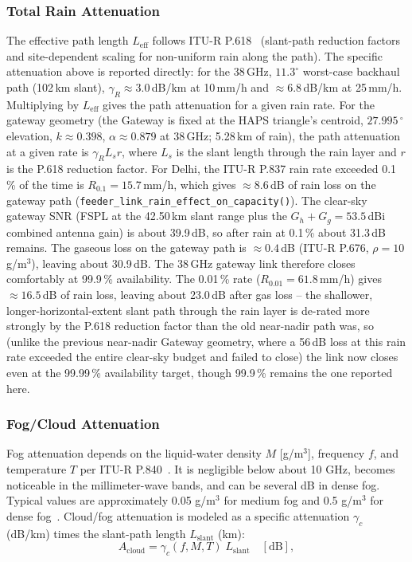 \documentclass[conference]{IEEEtran}
\begin{document}
\subsubsection{Total Rain Attenuation~\cite{itu_p618}}
The effective path length $L_\mathrm{eff}$ follows ITU-R P.618~\cite{itu_p618} (slant-path reduction factors and
site-dependent scaling for non-uniform rain along the path). The specific attenuation above is reported directly: for the 38\,GHz, $11.3^\circ$ worst-case backhaul path (102\,km slant), $\gamma_R\approx3.0$\,dB/km at 10\,mm/h and $\approx6.8$\,dB/km at 25\,mm/h. Multiplying by $L_\mathrm{eff}$ gives the path attenuation for a given rain rate. For the gateway geometry (the Gateway is fixed at the HAPS triangle's centroid, $27.995\,^\circ$ elevation, $k\approx0.398$, $\alpha\approx0.879$ at 38\,GHz; 5.28\,km of rain), the path attenuation at a given rate is $\gamma_R L_s r$, where $L_s$ is the slant length through the rain layer and $r$ is the P.618 reduction factor. For Delhi, the ITU-R P.837 rain rate exceeded 0.1\,\% of the time is $R_{0.1}=15.7$\,mm/h, which gives $\approx8.6$\,dB of rain loss on the gateway path (\texttt{feeder\_link\_rain\_effect\_on\_capacity()}). The clear-sky gateway SNR (FSPL at the 42.50\,km slant range plus the $G_h+G_g=53.5$\,dBi combined antenna gain) is about 39.9\,dB, so after rain at 0.1\,\% about 31.3\,dB remains. The gaseous loss on the gateway path is $\approx0.4$\,dB (ITU-R P.676, $\rho=10$\,g/m$^3$), leaving about 30.9\,dB. The 38\,GHz gateway link therefore closes comfortably at 99.9\,\% availability. The 0.01\,\% rate ($R_{0.01}=61.8$\,mm/h) gives $\approx16.5$\,dB of rain loss, leaving about 23.0\,dB after gas loss -- the shallower, longer-horizontal-extent slant path through the rain layer is de-rated more strongly by the P.618 reduction factor than the old near-nadir path was, so (unlike the previous near-nadir Gateway geometry, where a 56\,dB loss at this rain rate exceeded the entire clear-sky budget and failed to close) the link now closes even at the 99.99\,\% availability target, though 99.9\,\% remains the one reported here.

\subsubsection{Fog/Cloud Attenuation~\cite{itu_p840}}
Fog attenuation depends on the liquid-water density $M$ [g/m$^3$], frequency
$f$, and temperature $T$ per ITU-R P.840~\cite{itu_p840}. It is negligible below about 10 GHz, becomes noticeable
in the millimeter-wave bands, and can be several dB in dense fog.
Typical values are approximately 0.05 g/m$^3$ for medium fog and 0.5 g/m$^3$ for
dense fog~\cite{itu_p840}.
Cloud/fog attenuation is modeled as a specific attenuation $\gamma_c$ (dB/km)
times the slant-path length $L_\mathrm{slant}$ (km):
\begin{equation}
A_\mathrm{cloud} = \gamma_c(f,M,T) \;L_\mathrm{slant} \quad [\mathrm{dB}],
\label{eq:fog_loss}
\end{equation}
\end{document}
